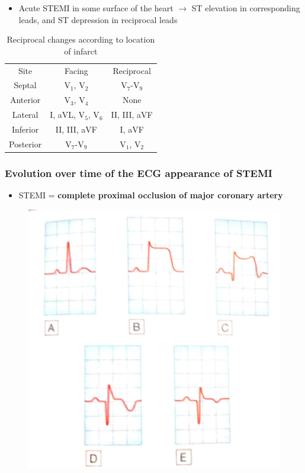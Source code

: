 \documentclass[
  12pt,
]{memoir}
\providecommand{\tightlist}{%
  \setlength{\itemsep}{0pt}\setlength{\parskip}{0pt}}
\begin{document}
\begin{itemize}
\tightlist
\item
  Acute STEMI in some surface of the heart \(\rightarrow\) ST elevation
  in corresponding leads, and ST depression in reciprocal leads
\end{itemize}

\renewcommand{\arraystretch}{1.5}
\begin{table}[h!]
\centering
\begin{tabular}{|c|c|c|}
\hline
\cellcolor{violet!60}\color{white}Site &
\cellcolor{violet!60}\color{white}Facing &
\cellcolor{violet!60}\color{white}Reciprocal \\
Septal & V$_1$, V$_2$ & V$_7$-V$_9$ \\
Anterior & V$_3$, V$_4$ & None \\
Lateral & I, aVL, V$_5$, V$_6$ & II, III, aVF \\
Inferior & II, III, aVF & I, aVF \\
Posterior & V$_7$-V$_9$ & V$_1$, V$_2$ \\
\hline
\end{tabular}
\vspace{3mm}
\caption{Reciprocal changes according to location of infarct}
\label{table:reciprocal}
\end{table}

\pagebreak

\hypertarget{evolution-over-time-of-the-ecg-appearance-of-stemi}{%
\subsubsection{Evolution over time of the ECG appearance of
STEMI}\label{evolution-over-time-of-the-ecg-appearance-of-stemi}}

\begin{itemize}
\tightlist
\item
  STEMI = \textbf{complete proximal occlusion of major coronary artery}
\end{itemize}

\begin{figure}
\centering
\includegraphics[width=.5\textwidth]{../assets/med/STEMI.jpg}
\end{figure}
\end{document}
